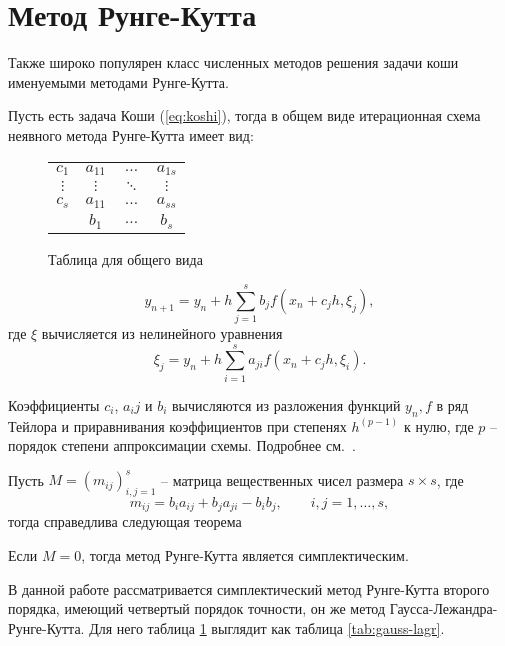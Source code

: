 \section{Метод Рунге-Кутта}
Также широко популярен класс численных методов решения задачи коши именуемыми
методами Рунге-Кутта.

Пусть есть задача Коши (\ref{eq:koshi}), тогда
в общем виде итерационная схема неявного метода Рунге-Кутта имеет вид:
\begin{figure}[h]
    \renewcommand{\arraystretch}{1.2}
    \centering
    \begin{tabular}{c|ccc}
        $c_1$    & $a_{11}$ & $\ldots$ & $a_{1s}$ \\
        $\vdots$ & $\vdots$ & $\ddots$ & $\vdots$ \\
        $c_s$    & $a_{11}$ & $\ldots$ & $a_{ss}$ \\ \hline
                 & $b_{1}$  & $\ldots$ & $b_{s}$ \\
    \end{tabular}
    \caption{Таблица для общего вида}
\label{tab:tableau_basic}
\end{figure}

\begin{equation}\label{eq:rk-schema}
    y_{n+1} = y_n + h\sum_{j=1}^s b_j f(x_n+c_jh, \xi_j),
\end{equation}
где $\xi$ вычисляется из нелинейного уравнения
\begin{equation}\label{eq:rk-not-linear}
    \xi_j = y_n + h\sum_{i=1}^{s}a_{ji} f(x_n+c_jh, \xi_i).
\end{equation}

Коэффициенты $c_i$, $a_ij$ и $b_i$ вычисляются из разложения функций $y_n,
f$ в ряд Тейлора и приравнивания коэффициентов при степенях $h^{(p-1)}$ к нулю,
где $p$ -- порядок степени аппроксимации схемы. Подробнее
см.~\cite[с.~75]{chilsl-metodi}.

Пусть $M=\left( m_{ij} \right)^s_{i,j=1}$ -- матрица вещественных чисел размера
$s\times s$, где
\begin{equation}
    m_{ij} = b_i a_{ij} + b_j a_{ji} - b_i b_j,\qquad i,j=1,\dots,s,
\end{equation}
тогда справедлива следующая теорема
\begin{theorem}
    Если $M = 0$, тогда метод Рунге-Кутта является симплектическим.
\end{theorem}

В данной работе рассматривается симплектический метод Рунге-Кутта
второго порядка, имеющий четвертый порядок точности,
он же метод Гаусса-Лежандра-Рунге-Кутта. Для него
таблица \ref{tab:tableau_basic} выглядит как таблица \ref{tab:gauss-lagr}.

